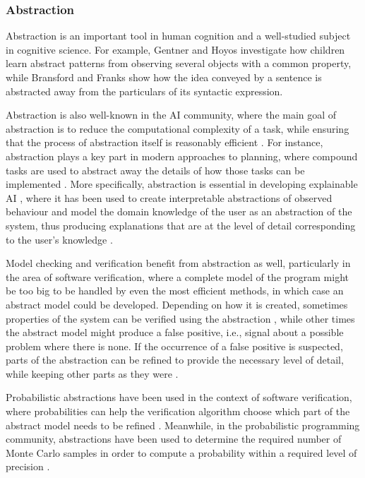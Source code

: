 \documentclass[11pt,english,twocolumn]{article}
\begin{document}
\subsubsection*{Abstraction}

Abstraction is an important tool in human cognition and a well-studied subject
in cognitive science. For example, Gentner and Hoyos \cite{Gentner2017-GENAAA-2}
investigate how children learn abstract patterns from observing several
objects with a common property, while Bransford and Franks
\cite{BRANSFORD1971331} show how the idea conveyed by a sentence is abstracted
away from the particulars of its syntactic expression.

Abstraction is also well-known in the AI community,
where the main goal of abstraction is to reduce the computational complexity of
a task, while ensuring that the process of abstraction itself is reasonably
efficient \cite{saitta2013abstraction}. For instance, abstraction plays a key
part in modern approaches to planning, where compound tasks are used to abstract
away the details of how those tasks can be implemented
\cite{DBLP:journals/amai/ErolHN96}. More specifically, abstraction is essential
in developing explainable AI \cite{DBLP:journals/access/AdadiB18}, where
it has been used to create interpretable abstractions of observed behaviour
\cite{DBLP:journals/corr/PenkovR17} and model the domain knowledge of the user
as an abstraction of the system, thus producing explanations that are at the
level of detail corresponding to the user's knowledge
\cite{DBLP:conf/ijcai/SreedharanSK18}.

Model checking and verification benefit from abstraction as well, particularly
in the area of software verification, where a complete model of the program
might be too big to be handled by even the most efficient methods, in which
case an abstract model could be developed. Depending on how it is created,
sometimes properties of the system can be verified using the abstraction
\cite{DBLP:journals/toplas/ClarkeGL94}, while other times the abstract model
might produce a false positive, i.e., signal about a possible problem where
there is none. If the occurrence of a false positive is suspected, parts of the
abstraction can be refined to provide the necessary level of detail, while
keeping other parts as they were
\cite{DBLP:conf/cav/ClarkeGJLV00,DBLP:conf/popl/HenzingerJMS02}.

Probabilistic abstractions have been used in the context of software
verification, where probabilities can help the verification algorithm choose
which part of the abstract model needs to be refined
\cite{DBLP:conf/pldi/ZhangSN17}. Meanwhile, in the probabilistic programming
community, abstractions have been used to determine the required number of Monte
Carlo samples in order to compute a probability within a required level of
precision \cite{DBLP:conf/popl/Monniaux01}.
\end{document}
